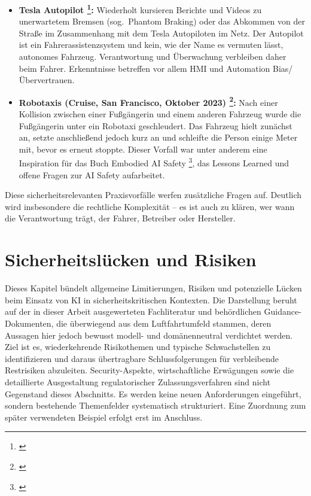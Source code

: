 \medskip
\begin{itemize}
  \item \textbf{Tesla Autopilot \footnote{ \parencite{NTSB_HWY18FH011}}:}
  Wiederholt kursieren Berichte und Videos zu unerwartetem Bremsen (sog.\ Phantom Braking) oder das Abkommen von der Straße
  im Zusammenhang mit dem Tesla Autopiloten im Netz. Der Autopilot ist ein Fahrerassistenzsystem und kein, 
  wie der Name es vermuten lässt, autonomes Fahrzeug. 
  Verantwortung und Überwachung verbleiben daher beim Fahrer. Erkenntnisse betreffen vor allem 
  HMI und Automation Bias/Übervertrauen. 
  \item \textbf{Robotaxis (Cruise, San Francisco, Oktober 2023) \footnote{ \parencite{Koopman:2025:EAI}}:}
  Nach einer Kollision zwischen einer Fußgängerin und einem anderen Fahrzeug wurde die Fußgängerin unter ein Robotaxi geschleudert. 
  Das Fahrzeug hielt zunächst an, setzte anschließend jedoch kurz an und schleifte die Person einige Meter mit, bevor es erneut stoppte. 
  Dieser Vorfall war unter anderem eine Inspiration für das Buch Embodied AI Safety \footnote{ \parencite{Koopman:2025:EAI}}, 
  das Lessons Learned und offene Fragen zur AI Safety aufarbeitet.
\end{itemize}

\medskip
Diese sicherheitsrelevanten Praxisvorfälle werfen zusätzliche Fragen auf. Deutlich wird insbesondere die rechtliche Komplexität --  
es ist auch zu klären, wer wann die Verantwortung trägt, der Fahrer, Betreiber oder Hersteller.






\chapter{Sicherheitslücken und Risiken}\label{chap:risiken}

Dieses Kapitel bündelt allgemeine Limitierungen, Risiken und potenzielle Lücken beim 
Einsatz von KI in sicherheitskritischen Kontexten. Die Darstellung beruht auf der in dieser 
Arbeit ausgewerteten Fachliteratur und behördlichen Guidance-Dokumenten, die überwiegend aus 
dem Luftfahrtumfeld stammen, deren Aussagen hier jedoch bewusst modell- und domänenneutral 
verdichtet werden. Ziel ist es, wiederkehrende Risikothemen und typische Schwachstellen zu 
identifizieren und daraus übertragbare Schlussfolgerungen für verbleibende Restrisiken abzuleiten. 
Security-Aspekte, wirtschaftliche Erwägungen sowie die detaillierte Ausgestaltung regulatorischer 
Zulassungsverfahren sind nicht Gegenstand dieses Abschnitts. Es werden keine neuen Anforderungen 
eingeführt, sondern bestehende Themenfelder systematisch strukturiert. Eine Zuordnung zum später 
verwendeten Beispiel erfolgt erst im Anschluss.

